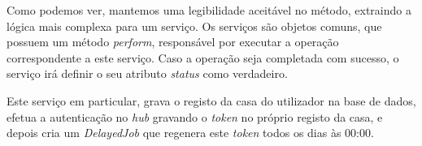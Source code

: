 Como podemos ver, mantemos uma legibilidade aceitável no método, extraindo a lógica mais complexa para um serviço. Os serviços são objetos comuns, que possuem um método \textit{perform}, responsável por executar a operação correspondente a este serviço. Caso a operação seja completada com sucesso, o serviço irá definir o seu atributo \textit{status} como verdadeiro.

Este serviço em particular, grava o registo da casa do utilizador na base de dados, efetua a autenticação no \textit{hub} gravando o \textit{token} no próprio registo da casa, e depois cria um \textit{DelayedJob} que regenera este \textit{token} todos os dias às 00:00.


